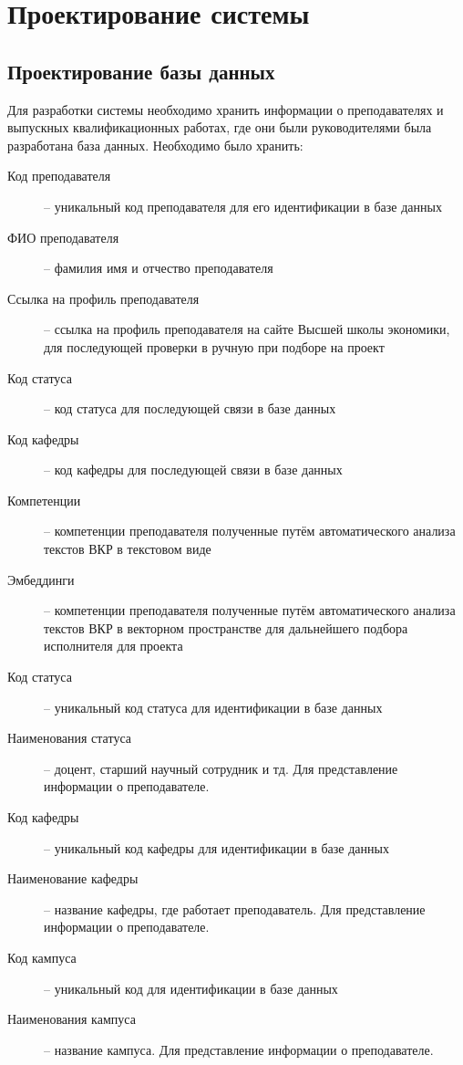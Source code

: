 \documentclass[PI,KR]{HSEUniversity}
\begin{document}
\chapter{Проектирование системы}
\section{Проектирование базы данных}
Для разработки системы необходимо хранить информации о преподавателях и выпускных квалификационных работах, где они были руководителями была разработана база данных. Необходимо было хранить:

\begin{description}
	\item [Код преподавателя] -- уникальный код преподавателя для его идентификации в базе данных
	\item [ФИО преподавателя] -- фамилия имя и отчество преподавателя
	\item [Ссылка на профиль преподавателя] -- ссылка на профиль преподавателя на сайте Высшей школы экономики, для последующей проверки в ручную при подборе на проект
	\item [Код статуса] -- код статуса для последующей связи в базе данных
	\item [Код кафедры] -- код кафедры для последующей связи в базе данных
	\item [Компетенции] -- компетенции преподавателя полученные путём автоматического анализа текстов ВКР в текстовом виде
	\item [Эмбеддинги] -- компетенции преподавателя полученные путём автоматического анализа текстов ВКР в векторном пространстве для дальнейшего подбора исполнителя для проекта
	
	\item [Код статуса] -- уникальный код статуса для идентификации в базе данных
	\item [Наименования статуса] -- доцент, старший научный сотрудник и тд. Для представление информации о преподавателе.
	
	\item [Код кафедры] -- уникальный код кафедры для идентификации в базе данных
	\item [Наименование кафедры] -- название кафедры, где работает преподаватель. Для представление информации о преподавателе.
	
	\item [Код кампуса] -- уникальный код для идентификации в базе данных
	\item [Наименования кампуса] -- название кампуса. Для представление информации о преподавателе.
	

\end{description}
\end{document}
